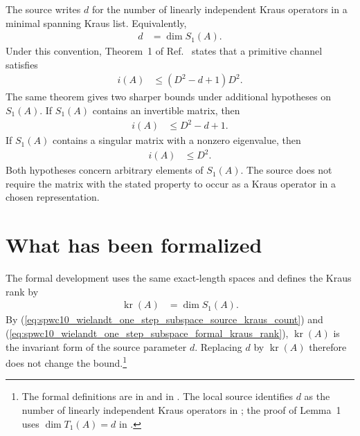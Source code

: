 \documentclass{article}
\begin{document}
The source writes $d$ for the number of linearly independent Kraus operators
in a minimal spanning Kraus list. Equivalently,
\begin{align}
    d
        &=
        \dim S_1(A).
    \label{eq:spwc10_wielandt_one_step_subspace_source_kraus_count}
\end{align}
Under this convention, Theorem~1 of Ref.~\cite{Sanz2010Quantum} states that a
primitive channel satisfies
\begin{align}
    i(A)
        &\leq
        (D^2-d+1)D^2.
    \label{eq:spwc10_wielandt_one_step_subspace_general_source_bound}
\end{align}
The same theorem gives two sharper bounds under additional hypotheses on
$S_1(A)$. If $S_1(A)$ contains an invertible matrix, then
\begin{align}
    i(A)
        &\leq
        D^2-d+1.
    \label{eq:spwc10_wielandt_one_step_subspace_invertible_source_bound}
\end{align}
If $S_1(A)$ contains a singular matrix with a nonzero eigenvalue, then
\begin{align}
    i(A)
        &\leq
        D^2.
    \label{eq:spwc10_wielandt_one_step_subspace_singular_source_bound}
\end{align}
Both hypotheses concern arbitrary elements of $S_1(A)$. The source does not
require the matrix with the stated property to occur as a Kraus operator in a
chosen representation.

\section{What has been formalized}

The formal development uses the same exact-length spaces and defines the Kraus
rank by
\begin{align}
    \operatorname{kr}(A)
        &=
        \dim S_1(A).
    \label{eq:spwc10_wielandt_one_step_subspace_formal_kraus_rank}
\end{align}
By (\ref{eq:spwc10_wielandt_one_step_subspace_source_kraus_count}) and
(\ref{eq:spwc10_wielandt_one_step_subspace_formal_kraus_rank}),
$\operatorname{kr}(A)$ is the invariant form of the source parameter $d$.
Replacing $d$ by $\operatorname{kr}(A)$ therefore does not change the
bound.\footnote{The formal definitions are
     in
     and
     in
    . The local
    source identifies $d$ as the number of linearly independent Kraus
    operators in ; the proof of
    Lemma~1 uses $\dim T_1(A)=d$ in
    .}
\end{document}
